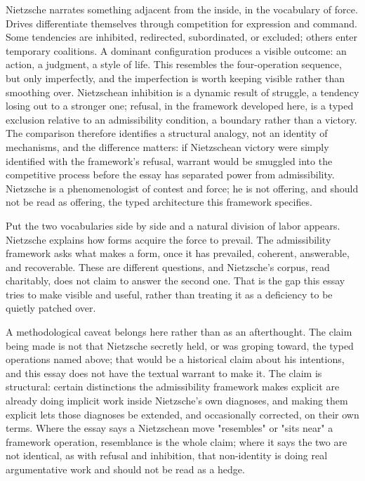 \documentclass[11pt]{article}
\begin{document}
Nietzsche narrates something adjacent from the inside, in the vocabulary of force. Drives differentiate themselves through competition for expression and command. Some tendencies are inhibited, redirected, subordinated, or excluded; others enter temporary coalitions. A dominant configuration produces a visible outcome: an action, a judgment, a style of life. This resembles the four-operation sequence, but only imperfectly, and the imperfection is worth keeping visible rather than smoothing over. Nietzschean inhibition is a dynamic result of struggle, a tendency losing out to a stronger one; refusal, in the framework developed here, is a typed exclusion relative to an admissibility condition, a boundary rather than a victory. The comparison therefore identifies a structural analogy, not an identity of mechanisms, and the difference matters: if Nietzschean victory were simply identified with the framework's refusal, warrant would be smuggled into the competitive process before the essay has separated power from admissibility. Nietzsche is a phenomenologist of contest and force; he is not offering, and should not be read as offering, the typed architecture this framework specifies.

Put the two vocabularies side by side and a natural division of labor appears. Nietzsche explains how forms acquire the force to prevail. The admissibility framework asks what makes a form, once it has prevailed, coherent, answerable, and recoverable. These are different questions, and Nietzsche's corpus, read charitably, does not claim to answer the second one. That is the gap this essay tries to make visible and useful, rather than treating it as a deficiency to be quietly patched over.

A methodological caveat belongs here rather than as an afterthought. The claim being made is not that Nietzsche secretly held, or was groping toward, the typed operations named above; that would be a historical claim about his intentions, and this essay does not have the textual warrant to make it. The claim is structural: certain distinctions the admissibility framework makes explicit are already doing implicit work inside Nietzsche's own diagnoses, and making them explicit lets those diagnoses be extended, and occasionally corrected, on their own terms. Where the essay says a Nietzschean move "resembles" or "sits near" a framework operation, resemblance is the whole claim; where it says the two are not identical, as with refusal and inhibition, that non-identity is doing real argumentative work and should not be read as a hedge.
\end{document}
